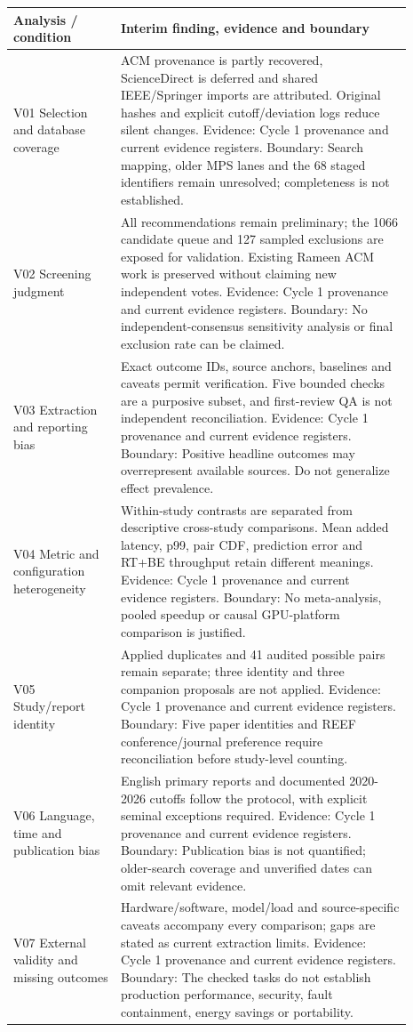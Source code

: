 \documentclass[12pt,a4paper]{article}
\begin{document}
\begin{longtable}{p{0.24\linewidth}p{0.65\linewidth}}
\toprule
Analysis /\allowbreak{} condition & Interim finding, evidence and boundary\\\midrule
\endhead
V01 Selection and database coverage & ACM provenance is partly recovered, ScienceDirect is deferred and shared IEEE/\allowbreak{}Springer imports are attributed. Original hashes and explicit cutoff/\allowbreak{}deviation logs reduce silent changes. Evidence: Cycle 1 provenance and current evidence registers. Boundary: Search mapping, older MPS lanes and the 68 staged identifiers remain unresolved; completeness is not established.\\
V02 Screening judgment & All recommendations remain preliminary; the 1066 candidate queue and 127 sampled exclusions are exposed for validation. Existing Rameen ACM work is preserved without claiming new independent votes. Evidence: Cycle 1 provenance and current evidence registers. Boundary: No independent-consensus sensitivity analysis or final exclusion rate can be claimed.\\
V03 Extraction and reporting bias & Exact outcome IDs, source anchors, baselines and caveats permit verification. Five bounded checks are a purposive subset, and first-review QA is not independent reconciliation. Evidence: Cycle 1 provenance and current evidence registers. Boundary: Positive headline outcomes may overrepresent available sources. Do not generalize effect prevalence.\\
V04 Metric and configuration heterogeneity & Within-study contrasts are separated from descriptive cross-study comparisons. Mean added latency, p99, pair CDF, prediction error and RT+BE throughput retain different meanings. Evidence: Cycle 1 provenance and current evidence registers. Boundary: No meta-analysis, pooled speedup or causal GPU-platform comparison is justified.\\
V05 Study/\allowbreak{}report identity & Applied duplicates and 41 audited possible pairs remain separate; three identity and three companion proposals are not applied. Evidence: Cycle 1 provenance and current evidence registers. Boundary: Five paper identities and REEF conference/\allowbreak{}journal preference require reconciliation before study-level counting.\\
V06 Language, time and publication bias & English primary reports and documented 2020-2026 cutoffs follow the protocol, with explicit seminal exceptions required. Evidence: Cycle 1 provenance and current evidence registers. Boundary: Publication bias is not quantified; older-search coverage and unverified dates can omit relevant evidence.\\
V07 External validity and missing outcomes & Hardware/\allowbreak{}software, model/\allowbreak{}load and source-specific caveats accompany every comparison; gaps are stated as current extraction limits. Evidence: Cycle 1 provenance and current evidence registers. Boundary: The checked tasks do not establish production performance, security, fault containment, energy savings or portability.\\
\bottomrule
\end{longtable}
\end{document}
